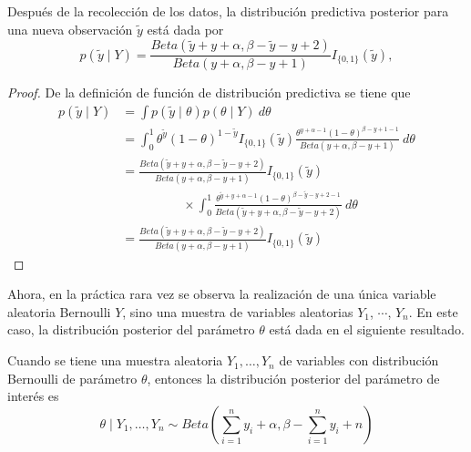     \begin{Res}
    Despu\'es de la recolecci\'on de los datos, la distribuci\'on predictiva posterior para una nueva observaci\'on $\tilde{y}$ est\'a dada por
    \begin{equation}
    p(\tilde{y} \mid Y)=\frac{Beta(\tilde{y}+y+\alpha,\beta-\tilde{y}-y+2)}{Beta(y+\alpha,\beta-y+1)}I_{\{0,1\}}(\tilde{y}),
    \end{equation}
    \end{Res}
    
    \begin{proof}
    De la definici\'on de funci\'on de distribuci\'on predictiva se tiene que
    \begin{align*}
    p(\tilde{y} \mid Y)&=\int p(\tilde{y} \mid \theta)p(\theta \mid Y)\ d\theta\\
    &=\int_0^1\theta^{\tilde{y}}(1-\theta)^{1-\tilde{y}}I_{\{0,1\}}(\tilde{y})
    \frac{\theta^{y+\alpha-1}(1-\theta)^{\beta-y+1-1}}{Beta(y+\alpha,\beta-y+1)}\ d\theta\\
    &=\frac{Beta(\tilde{y}+y+\alpha,\beta-\tilde{y}-y+2)}{Beta(y+\alpha,\beta-y+1)}I_{\{0,1\}}(\tilde{y})\\
    &\hspace{2cm}\times \int_0^1\frac{\theta^{\tilde{y}+y+\alpha-1}(1-\theta)^{\beta-\tilde{y}-y+2-1}}
    {Beta(\tilde{y}+y+\alpha,\beta-\tilde{y}-y+2)}\ d\theta\\
    &=\frac{Beta(\tilde{y}+y+\alpha,\beta-\tilde{y}-y+2)}{Beta(y+\alpha,\beta-y+1)}I_{\{0,1\}}(\tilde{y})
    \end{align*}
    \end{proof}
    
    Ahora, en la pr\'actica rara vez se observa la realizaci\'on de una \'unica variable aleatoria Bernoulli $Y$, sino una muestra de variables aleatorias $Y_1$, $\cdots$, $Y_n$. En este caso, la distribuci\'on posterior del par\'ametro $\theta$ est\'a dada en el siguiente resultado.
    
    \begin{Res}
    Cuando se tiene una muestra aleatoria $Y_1,\ldots,Y_n$ de variables con distribuci\'on Bernoulli de par\'ametro $\theta$, entonces la distribuci\'on posterior del par\'ametro de inter\'es es
    \begin{equation*}
    \theta \mid Y_1,\ldots,Y_n \sim Beta\left(\sum_{i=1}^ny_i+\alpha,\beta-\sum_{i=1}^ny_i+n\right)
    \end{equation*}
    \end{Res}
    
